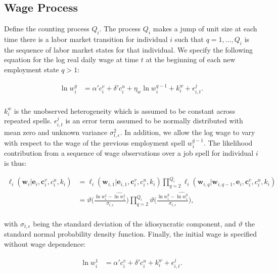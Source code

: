 \documentclass[12pt, a4paper]{article}
\begin{document}
\subsection{Wage Process}\label{sec:income_process}

Define the counting process $Q_{i}$. The process $Q_{i}$ makes a jump of unit size at each time there is a labor market transition for individual $i$ such that $q=1,...,Q_{i}$ is the sequence of labor market states for that individual. We specify the following equation for the log real daily wage at time $t$ at the beginning of each new employment state $q>1$:

\begin{align}
\ln w_{i}^{q} & = \alpha' c_i^{v} + \delta' c_i^u + \eta_{w}\ln w_{i}^{q-1} + k_i^w + \epsilon_{i,t}^{j} .\\ \nonumber
\end{align}

$k_i^{w}$ is the unobserved heterogeneity which is assumed to be constant across repeated spells. $\epsilon_{i,t}^j$ is an error term assumed to be normally distributed with mean zero and unknown variance $\sigma_{t,\epsilon}^{2}$. In addition, we allow the log wage to vary with respect to the wage of the previous employment spell $w_{i}^{q-1}$. The likelihood contribution from a sequence of wage observations over a job spell for individual $i$ is thus:

\begin{align}\label{eq:Likelihood_wages}
\ell_{i}(\textbf{w}_i|\textbf{e}_i,\textbf{c}_i^v,c_i^u,k_i) & =  \ell_{i}(\textbf{w}_{i,1}|\textbf{e}_{i,1},\textbf{c}_i^v,c_i^u,k_i) \prod_{q=2}^{Q_i} \ell_{i}(\textbf{w}_{i,q}|\textbf{w}_{i,q-1},\textbf{e}_{i},\textbf{c}_i^v,c_i^u,k_i) \\ \nonumber
& = \vartheta\Big(\frac{\ln w_{i}^{1}- \widehat{\ln w_{i}^{1}}}{\sigma_{t,\epsilon}}\Big) \prod_{q=2}^{Q_i} \vartheta\Big(\frac{\ln w_{i}^{q}- \widehat{\ln w_{i}^{q}}}{\sigma_{t,\epsilon}}\Big), \\ \nonumber
\end{align}

with $\sigma_{t,\epsilon}$ being the standard deviation of the idiosyncratic component, and $\vartheta$ the standard normal probability density function. Finally, the initial wage is specified without wage dependence:

\begin{align}
\ln w_{i}^{1} & = \alpha' c_i^{v} + \delta' c_i^u + k_i^w + \epsilon_{i,t}^{j} .\\ \nonumber
\end{align}
\end{document}
